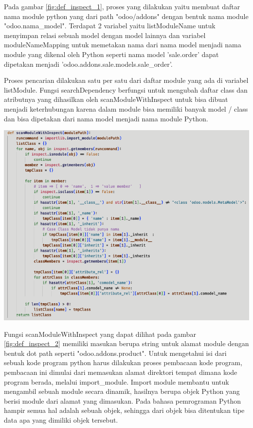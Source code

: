 Pada gambar \ref{fig:def_inspect_1}, proses yang dilakukan yaitu membuat daftar nama module python yang dari path "odoo/addons" dengan bentuk nama module "odoo.nama{\_}model". Terdapat 2 variabel yaitu listModuleName untuk menyimpan relasi sebuah model dengan model lainnya dan variabel moduleNameMapping untuk memetakan nama dari nama model menjadi nama module yang dikenal oleh Python seperti nama model 'sale.order' dapat dipetakan menjadi 'odoo.addons.sale.models.sale{\_}order'.

Proses pencarian dilakukan satu  per satu dari daftar module yang ada di variabel listModule. Fungsi searchDependency berfungsi untuk mengubah daftar class dan atributnya yang dihasilkan oleh scanModuleWithInspect untuk bisa dibuat menjadi keterhubungan karena dalam module bisa memiliki banyak model / class dan bisa dipetakan dari nama model menjadi nama module Python.  

\begin{center}
	\includegraphics[width=14cm]{img/bab_4/def_inspect_2.png}
	\label{fig:def_inspect_2}
\end{center}

Fungsi scanModuleWithInspect yang dapat dilihat pada gambar \ref{fig:def_inspect_2} memiliki masukan berupa string untuk alamat module dengan bentuk dot path seperti "odoo.addons.product".  Untuk mengetahui isi dari sebuah kode program python harus dilakukan proses pembacaan kode program, pembacaan ini dimulai dari memasukan alamat direktori tempat dimana kode program berada, melalui import{\_}module. Import module membantu untuk mengambil sebuah module secara dinamik, hasilnya berupa objek Python yang berisi module dari alamat yang dimasukan. Pada bahasa pemrograman Python hampir semua hal adalah sebuah objek, sehingga dari objek bisa ditentukan tipe data apa yang dimiliki objek tersebut.

